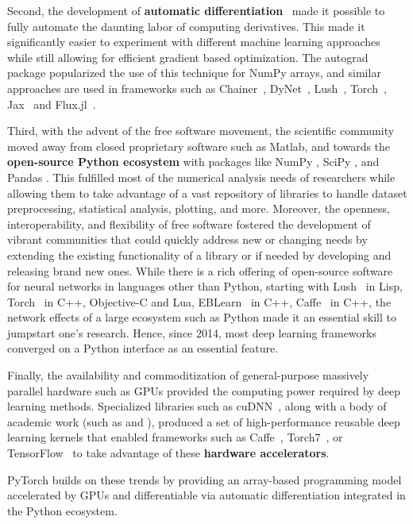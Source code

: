 Second, the development of \textbf{automatic differentiation}~\cite{autodiff_survey} made it possible to fully automate the daunting labor of computing derivatives. This made it significantly easier to experiment with different machine learning approaches while still allowing for efficient gradient based optimization. The autograd~\cite{maclaurin2016phd} package popularized the use of this technique for NumPy arrays, and similar approaches are used in frameworks such as Chainer~\cite{Chainer}, DyNet~\cite{DyNet}, Lush~\cite{Lush}, Torch~\cite{Torch}, Jax~\cite{jax} and Flux.jl~\cite{flux}.


Third, with the advent of the free software movement, the scientific community moved away from closed proprietary software such as Matlab\cite{Matlab}, and towards the \textbf{open-source Python ecosystem} with packages like NumPy \cite{Numpy}, SciPy \cite{SciPy}, and Pandas \cite{Pandas}. This fulfilled most of the numerical analysis needs of researchers while allowing them to take advantage of a vast repository of libraries to handle dataset preprocessing, statistical analysis, plotting, and more. Moreover, the openness, interoperability, and flexibility of free software fostered the development of vibrant communities that could quickly address new or changing needs by extending the existing functionality of a library or if needed by developing and releasing brand new ones. While there is a rich offering of open-source software for neural networks in languages other than Python, starting with Lush~\cite{Lush} in Lisp, Torch~\cite{Torch} in C++, Objective-C and Lua, EBLearn~\cite{EBLearn} in C++, Caffe~\cite{Caffe} in C++, the network effects of a large ecosystem such as Python made it an essential skill to jumpstart one's research. Hence, since 2014, most deep learning frameworks converged on a Python interface as an essential feature.
  
Finally, the availability and commoditization of general-purpose massively parallel hardware such as GPUs provided the computing power required by deep learning methods. Specialized libraries such as cuDNN~\cite{cudnn}, along with a body of academic work (such as \cite{maxdnn} and \cite{fast_cnn}), produced a set of high-performance reusable deep learning kernels that enabled frameworks such as Caffe~\cite{Caffe}, Torch7~\cite{Torch7}, or TensorFlow~\cite{TF} to take advantage of these \textbf{hardware accelerators}.

PyTorch builds on these trends by providing an array-based programming model accelerated by GPUs and differentiable via automatic differentiation integrated in the Python ecosystem.


